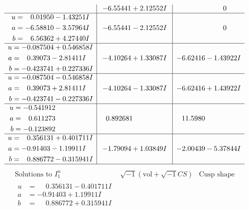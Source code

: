 \documentclass[1p]{elsarticle_modified}
\theoremstyle{definition}
\newcommand{\I}{\sqrt{-1}}
\begin{document}
$$\begin{array}{c|c|c}
 & -6.55441 + 2.12552 I & \phantom{-0.000000 } 0 \\ \hline\begin{aligned}
u &= \phantom{-}0.01950 - 1.43251 I \\
a &= -6.58810 - 3.57964 I \\
b &= \phantom{-}6.56362 + 4.27440 I\end{aligned}
 & -6.55441 - 2.12552 I & \phantom{-0.000000 } 0 \\ \hline\begin{aligned}
u &= -0.087504 + 0.546858 I \\
a &= \phantom{-}0.39073 - 2.81411 I \\
b &= -0.423741 + 0.227336 I\end{aligned}
 & -4.10264 + 1.33087 I & -6.62416 - 1.43922 I \\ \hline\begin{aligned}
u &= -0.087504 - 0.546858 I \\
a &= \phantom{-}0.39073 + 2.81411 I \\
b &= -0.423741 - 0.227336 I\end{aligned}
 & -4.10264 - 1.33087 I & -6.62416 + 1.43922 I \\ \hline\begin{aligned}
u &= -0.541912\phantom{ +0.000000I} \\
a &= \phantom{-}0.611273\phantom{ +0.000000I} \\
b &= -0.123892\phantom{ +0.000000I}\end{aligned}
 & \phantom{-}0.892681\phantom{ +0.000000I} & \phantom{-}11.5980\phantom{ +0.000000I} \\ \hline\begin{aligned}
u &= \phantom{-}0.356131 + 0.401711 I \\
a &= -0.91403 - 1.19911 I \\
b &= \phantom{-}0.886772 - 0.315941 I\end{aligned}
 & -1.79094 + 1.03849 I & -2.00439 - 5.37844 I\\
 \hline 
 \end{array}$$\newpage$$\begin{array}{c|c|c}  
\text{Solutions to }I^u_{1}& \I (\text{vol} + \sqrt{-1}CS) & \text{Cusp shape}\\
 \hline 
\begin{aligned}
u &= \phantom{-}0.356131 - 0.401711 I \\
a &= -0.91403 + 1.19911 I \\
b &= \phantom{-}0.886772 + 0.315941 I\end{aligned}

\end{array}$$
\end{document}
